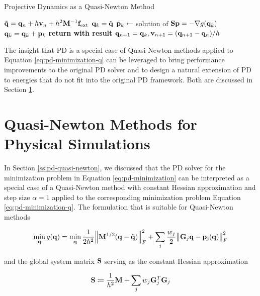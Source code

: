 \begin{algorithm}
\caption{Projective Dynamics as a Quasi-Newton Method}\label{alg:pd-qn}
\begin{algorithmic}
\State $\tilde{\mathbf{q}} = \mathbf{q}_n + h\mathbf{v}_n + h^2\mathbf{M}^{-1}\mathbf{f}_{\text{ext}}$
\State $\mathbf{q}_k = \tilde{\mathbf{q}}$
\State $\mathbf{p}_k \gets$ solution of $\mathbf{S}\mathbf{p} = -\nabla g(\mathbf{q}_k)$
\State $\mathbf{q}_k = \mathbf{q}_k + \mathbf{p}_k$
\EndFor
\State \textbf{return with result } $\mathbf{q}_{n+1} = \mathbf{q}_k, \mathbf{v}_{n+1} = (\mathbf{q}_{n+1} - \mathbf{q}_n)/h$
\EndProcedure
\end{algorithmic}
\end{algorithm}

The insight that PD is a special case of Quasi-Newton methods applied to Equation \ref{eq:pd-minimization-q} can be leveraged to
bring performance improvements to the original PD solver and to design a natural extension of PD to energies that do not fit 
into the original PD framework. Both are discussed in Section \ref{s:qn-rts}.

\section{Quasi-Newton Methods for Physical Simulations}\label{s:qn-rts}
In Section \ref{ss:pd-quasi-newton}, we discussed that the PD solver for the minimization problem in Equation \ref{eq:pd-minimization}
can be interpreted as a special case of a Quasi-Newton method with constant Hessian approximation and step size $\alpha = 1$
applied to the corresponding minimization problem Equation \ref{eq:pd-minimization-q}. The formulation that is suitable for Quasi-Newton
methods

\begin{equation}\label{eq:pd-minimization-q2}
    \min_{\mathbf{q}} g(\mathbf{q}) = 
    \min_{\mathbf{q}} \frac{1}{2h^2} \norm{\mathbf{M}^{1/2}(\mathbf{q} - \tilde{\mathbf{q}})}^2_F + \sum_j \frac{w_j}{2} \norm{\mathbf{G}_j\mathbf{q}
    - \mathbf{p_j}(\mathbf{q})}^2_F
\end{equation}

\noindent and the global system matrix $\mathbf{S}$ serving as the constant Hessian approximation

\begin{equation}\label{eq:global-matrix}
    \mathbf{S} \coloneqq \frac{1}{h^2}\mathbf{M} + \sum_j w_j \mathbf{G}_j^T \mathbf{G}_j  
\end{equation}

